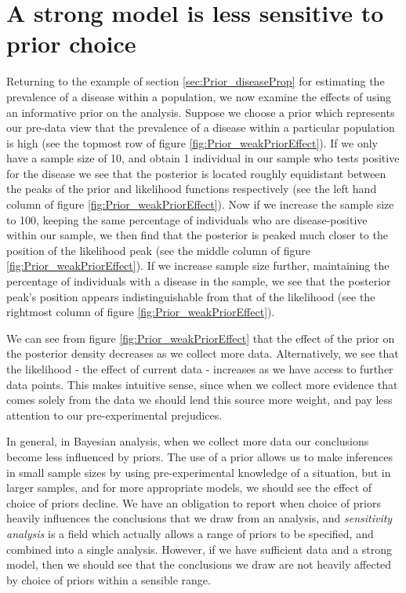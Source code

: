 \documentclass[11pt,fullpage]{book}
\begin{document}
\section{A strong model is less sensitive to prior choice}
Returning to the example of section \ref{sec:Prior_diseaseProp} for estimating the prevalence of a disease within a population, we now examine the effects of using an informative prior on the analysis. Suppose we choose a prior which represents our pre-data view that the prevalence of a disease within a particular population is high (see the topmost row of figure \ref{fig:Prior_weakPriorEffect}). If we only have a sample size of 10, and obtain 1 individual in our sample who tests positive for the disease we see that the posterior is located roughly equidistant between the peaks of the prior and likelihood functions respectively (see the left hand column of figure \ref{fig:Prior_weakPriorEffect}). Now if we increase the sample size to 100, keeping the same percentage of individuals who are disease-positive within our sample, we then find that the posterior is peaked much closer to the position of the likelihood peak (see the middle column of figure \ref{fig:Prior_weakPriorEffect}). If we increase sample size further, maintaining the percentage of individuals with a disease in the sample, we see that the posterior peak's position appears indistinguishable from that of the likelihood (see the rightmost column of figure \ref{fig:Prior_weakPriorEffect}). 

We can see from figure \ref{fig:Prior_weakPriorEffect} that the effect of the prior on the posterior density decreases as we collect more data. Alternatively, we see that the likelihood - the effect of current data  - increases as we have access to further data points. This makes intuitive sense, since when we collect more evidence that comes solely from the data we should lend this source more weight, and pay less attention to our pre-experimental prejudices.

In general, in Bayesian analysis, when we collect more data our conclusions become less influenced by priors. The use of a prior allows us to make inferences in small sample sizes by using pre-experimental knowledge of a situation, but in larger samples, and for more appropriate models, we should see the effect of choice of priors decline. We have an obligation to report when choice of priors heavily influences the conclusions that we draw from an analysis, and \textit{sensitivity analysis} is a field which actually allows a range of priors to be specified, and combined into a single analysis. However, if we have sufficient data and a strong model, then we should see that the conclusions we draw are not heavily affected by choice of priors within a sensible range.
\end{document}
